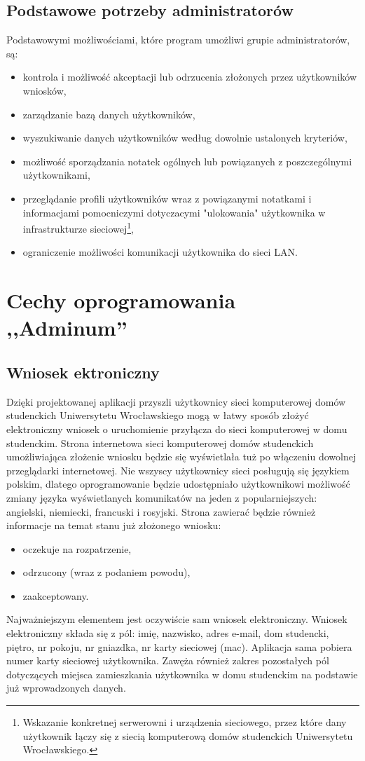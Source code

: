 \documentclass[12pt,a4paper,notitlepage]{article}
\begin{document}
	\subsection{Podstawowe potrzeby administratorów}
	Podstawowymi możliwościami, które program umożliwi grupie administratorów, są:
	\begin{itemize}
		\item kontrola i możliwość akceptacji lub odrzucenia złożonych przez użytkowników wniosków,
		\item zarządzanie bazą danych użytkowników,
		\item wyszukiwanie danych użytkowników według dowolnie ustalonych kryteriów,
		\item możliwość sporządzania notatek ogólnych lub powiązanych z poszczególnymi użytkownikami,
		\item przeglądanie profili użytkowników wraz z powiązanymi notatkami i informacjami pomocniczymi dotyczacymi "ulokowania" użytkownika w infrastrukturze sieciowej\footnote{Wskazanie konkretnej serwerowni i urządzenia sieciowego, przez które dany użytkownik łączy się z siecią komputerową domów studenckich Uniwersytetu Wrocławskiego.},
		\item ograniczenie możliwości komunikacji użytkownika do sieci LAN.
	\end{itemize}
    \section{Cechy oprogramowania ,,Adminum''} 
	\subsection{Wniosek ektroniczny}
	Dzięki projektowanej aplikacji przyszli użytkownicy sieci komputerowej domów studenckich Uniwersytetu Wrocławskiego mogą w łatwy sposób złożyć elektroniczny wniosek o uruchomienie przyłącza do sieci komputerowej w domu studenckim. Strona internetowa sieci komputerowej domów studenckich umożliwiająca złożenie wniosku będzie się wyświetlała tuż po włączeniu dowolnej przeglądarki internetowej. Nie wszyscy użytkownicy sieci posługują się językiem polskim, dlatego oprogramowanie będzie udostępniało użytkownikowi możliwość zmiany języka wyświetlanych komunikatów na jeden z popularniejszych: angielski, niemiecki, francuski i rosyjski. Strona zawierać będzie również informacje na temat stanu już złożonego wniosku:
	\begin{itemize}
		\item oczekuje na rozpatrzenie,
		\item odrzucony (wraz z podaniem powodu),
		\item zaakceptowany.
	\end{itemize}
	Najważniejszym elementem jest oczywiście sam wniosek elektroniczny. Wniosek elektroniczny składa się z pól: imię, nazwisko, adres e-mail, dom studencki, piętro, nr pokoju, nr gniazdka, nr karty sieciowej (mac). Aplikacja sama pobiera numer karty sieciowej użytkownika. Zawęża również zakres pozostałych pól dotyczących miejsca zamieszkania użytkownika w domu studenckim na podstawie już wprowadzonych danych.
\end{document}
